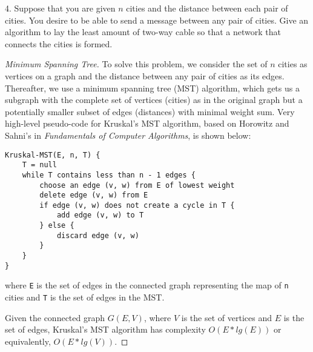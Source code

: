 \documentclass{scrartcl}
\begin{document}
\begin{flushleft}
    \newpage
    4. Suppose that you are given $n$ cities and the distance between each pair of cities. You
    desire to be able to send a message between any pair of cities. Give an algorithm to lay the
    least amount of two-way cable so that a network that connects the cities is formed.
    \begin{proof}[Minimum Spanning Tree]\let\qed\relax
        To solve this problem, we consider the set of $n$ cities as vertices on a graph and the
        distance between any pair of cities as its edges. Thereafter, we use a minimum spanning tree
        (MST) algorithm, which gets us a subgraph with the complete set of vertices (cities) as in
        the original graph but a potentially smaller subset of edges (distances) with minimal weight
        sum. Very high-level pseudo-code for Kruskal's MST algorithm, based on Horowitz and Sahni's
        in \textit{Fundamentals of Computer Algorithms}, is shown below:
        \medskip
\begin{verbatim}
Kruskal-MST(E, n, T) {
    T = null
    while T contains less than n - 1 edges {
        choose an edge (v, w) from E of lowest weight
        delete edge (v, w) from E
        if edge (v, w) does not create a cycle in T {
            add edge (v, w) to T
        } else {
            discard edge (v, w)
        }
    }
}
\end{verbatim}
        where \verb|E| is the set of edges in the connected graph representing the map of \verb|n|
        cities and \verb|T| is the set of edges in the MST.
        \bigskip

        Given the connected graph $G(E, V)$, where $V$ is the set of vertices and $E$ is the set of
        edges, Kruskal's MST algorithm has complexity $O(E * lg(E))$ or equivalently, $O(E *
        lg(V))$.
    \end{proof}

\end{flushleft}
\end{document}

